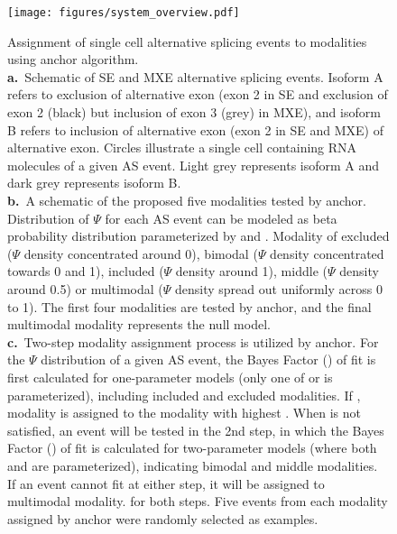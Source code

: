 \clearpage
\begin{figure}[h]
\ContinuedFloat
\captionsetup{labelformat=empty}
\centering
\texttt{[image: figures/system\_overview.pdf]}
\end{figure}
\clearpage



\clearpage
\thispagestyle{facingcaption}
\begin{figure}[h]
\captionsetup{labelformat=prev-page}
\caption[Assignment of single cell alternative splicing events to modalities using anchor algorithm.]{
Assignment of single cell alternative splicing events to modalities using anchor algorithm.\\
\textbf{a.}~Schematic of SE and MXE alternative splicing events. Isoform A refers to exclusion of alternative exon (exon 2 in SE and exclusion of exon 2 (black) but inclusion of exon 3 (grey) in MXE), and isoform B refers to inclusion of alternative exon (exon 2 in SE and MXE) of alternative exon. Circles illustrate a single cell containing RNA molecules of a given AS event. Light grey represents isoform A and dark grey represents isoform B. \\
\textbf{b.}~A schematic of the proposed five modalities tested by anchor. Distribution of $\Psi$ for each AS event can be modeled as beta probability distribution parameterized by  and . Modality of excluded ($\Psi$ density concentrated around 0), bimodal ($\Psi$ density concentrated towards 0 and 1), included ($\Psi$ density around 1), middle ($\Psi$ density around 0.5) or multimodal ($\Psi$ density spread out uniformly across 0 to 1). The first four modalities are tested by anchor, and the final multimodal modality represents the null model. \\
\textbf{c.}~Two-step modality assignment process is utilized by anchor. For the $\Psi$ distribution of a given AS event, the Bayes Factor () of fit is first calculated for one-parameter models (only one of  or is parameterized), including included and excluded modalities. If , modality is assigned to the modality with highest . When is not satisfied, an event will be tested in the 2nd step, in which the Bayes Factor () of fit is calculated for two-parameter models (where both  and are parameterized), indicating bimodal and middle modalities. If an event cannot fit at either step, it will be assigned to multimodal modality.  for both steps. Five events from each modality assigned by anchor were randomly selected as examples.
}
\end{figure}
